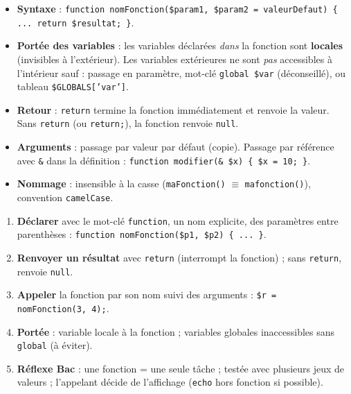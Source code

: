 \documentclass[11pt]{article}
\begin{document}
\begin{propriete}
\begin{itemize}
  \item \textbf{Syntaxe} : \texttt{function nomFonction(\$param1, \$param2 = valeurDefaut) \{ ... return \$resultat; \}}.
  \item \textbf{Portée des variables} : les variables déclarées \emph{dans} la fonction sont \textbf{locales} (invisibles à l'extérieur). Les variables extérieures ne sont \emph{pas} accessibles à l'intérieur sauf : passage en paramètre, mot-clé \texttt{global \$var} (déconseillé), ou tableau \texttt{\$GLOBALS['var']}.
  \item \textbf{Retour} : \texttt{return} termine la fonction immédiatement et renvoie la valeur. Sans \texttt{return} (ou \texttt{return;}), la fonction renvoie \texttt{null}.
  \item \textbf{Arguments} : passage par valeur par défaut (copie). Passage par référence avec \texttt{\&} dans la définition : \texttt{function modifier(\& \$x) \{ \$x = 10; \}}.
  \item \textbf{Nommage} : insensible à la casse (\texttt{maFonction()} $\equiv$ \texttt{mafonction()}), convention \texttt{camelCase}.
\end{itemize}
\end{propriete}

\begin{methode}
\begin{enumerate}
  \item \textbf{Déclarer} avec le mot-clé \texttt{function}, un nom explicite, des paramètres entre parenthèses : \texttt{function nomFonction(\$p1, \$p2) \{ ... \}}.
  \item \textbf{Renvoyer un résultat} avec \texttt{return} (interrompt la fonction) ; sans \texttt{return}, renvoie \texttt{null}.
  \item \textbf{Appeler} la fonction par son nom suivi des arguments : \texttt{\$r = nomFonction(3, 4);}.
  \item \textbf{Portée} : variable locale à la fonction ; variables globales inaccessibles sans \texttt{global} (à éviter).
  \item \textbf{Réflexe Bac} : une fonction = une seule tâche ; testée avec plusieurs jeux de valeurs ; l'appelant décide de l'affichage (\texttt{echo} hors fonction si possible).
\end{enumerate}
\end{methode}
\end{document}
